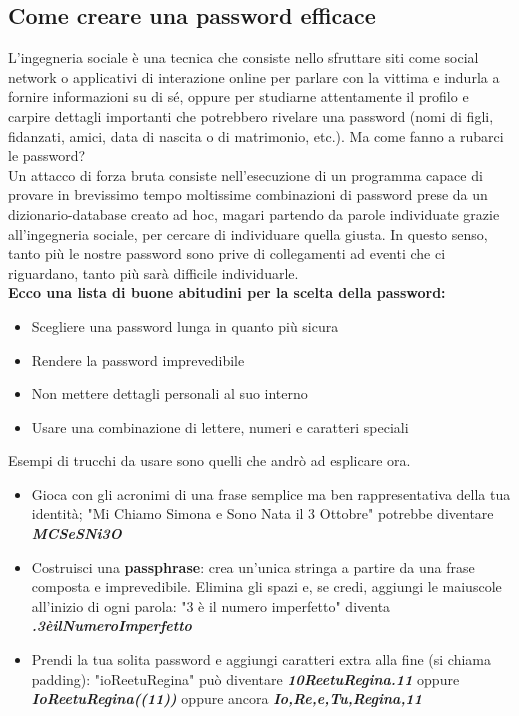 \documentclass{article}
\begin{document}
\subsection{Come creare una password efficace}
L'ingegneria sociale è una tecnica che consiste nello sfruttare siti come social network o applicativi di interazione online per parlare con la vittima e indurla a fornire informazioni su di sé, oppure per studiarne attentamente il profilo e carpire dettagli importanti che potrebbero rivelare una password (nomi di figli, fidanzati, amici, data di nascita o di matrimonio, etc.). Ma come fanno a rubarci le password?\\
Un attacco di forza bruta consiste nell’esecuzione di un programma capace di provare in brevissimo tempo moltissime combinazioni di password prese da un dizionario-database creato ad hoc, magari partendo da parole individuate grazie all'ingegneria sociale, per cercare di individuare quella giusta. In questo senso, tanto più le nostre password sono prive di collegamenti ad eventi che ci riguardano, tanto più sarà difficile individuarle.\\
\textbf{Ecco una lista di buone abitudini per la scelta della password:}
\begin{itemize}
	\item Scegliere una password lunga in quanto più sicura
	\item Rendere la password imprevedibile
	\item Non mettere dettagli personali al suo interno
	\item Usare una combinazione di lettere, numeri e caratteri speciali
\end{itemize}
Esempi di trucchi da usare sono quelli che andrò ad esplicare ora.\\
\begin{itemize}
	\item Gioca con gli acronimi di una frase semplice ma ben rappresentativa della tua identità; "Mi Chiamo Simona e Sono Nata il 3 Ottobre" potrebbe diventare \textit{\textbf{MCSeSNi3O}}	
	\item Costruisci una \textbf{passphrase}: crea un’unica stringa a partire da una frase composta e imprevedibile. Elimina gli spazi e, se credi, aggiungi le maiuscole all’inizio di ogni parola: "3 è il numero imperfetto" diventa \textit{\textbf{.3èilNumeroImperfetto}}
	\item Prendi la tua solita password e aggiungi caratteri extra alla fine (si chiama padding): "ioReetuRegina" può diventare \textit{\textbf{10ReetuRegina.11}} oppure \textit{\textbf{IoReetuRegina((11))}} oppure ancora \textit{\textbf{Io,Re,e,Tu,Regina,11}}
\end{itemize}
\end{document}

